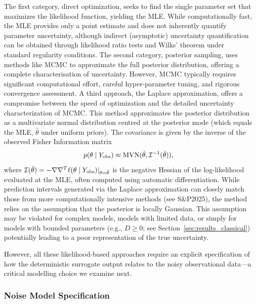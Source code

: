 \documentclass{article}
\newcommand{\SP}{S\&P2025}
\begin{document}
The first category, direct optimization, seeks to find the single parameter set that maximizes the likelihood function, yielding the MLE. While computationally fast, the MLE provides only a point estimate and does not inherently quantify parameter uncertainty, although indirect (asymptotic) uncertainty quantification can be obtained through likelihood ratio tests and Wilks' theorem under standard regularity conditions. The second category, posterior sampling, uses methods like MCMC to approximate the full posterior distribution, offering a complete characterisation of uncertainty. However, MCMC typically requires significant computational effort, careful hyper-parameter tuning, and rigorous convergence assessment. A third approach, the Laplace approximation, offers a compromise between the speed of optimization and the detailed uncertainty characterization of MCMC. This method approximates the posterior distribution as a multivariate normal distribution centred at the posterior mode (which equals the MLE, $\hat{\theta}$ under uniform priors). The covariance is given by the inverse of the observed Fisher Information matrix
\begin{equation}
	p(\theta \mid Y_{\rm obs}) \approx \text{MVN}(\hat{\theta}, \mathcal{I}^{-1}(\hat{\theta})),
\end{equation}
where $\mathcal{I}(\hat{\theta}) = -\nabla\nabla^T \ell(\theta \mid Y_{\rm obs})|_{\theta=\hat{\theta}}$ is the negative Hessian of the log-likelihood evaluated at the MLE, often computed using automatic differentiation. While prediction intervals generated via the Laplace approximation can closely match those from more computationally intensive methods (see \SP), the method relies on the assumption that the posterior is locally Gaussian. This assumption may be violated for complex models, models with limited data, or simply for models with bounded parameters (e.g., $D \ge 0$; see Section~\ref{sec:results_classical}) potentially leading to a poor representation of the true uncertainty.

However, all these likelihood-based approaches require an explicit specification of how the deterministic surrogate output relates to the noisy observational data---a critical modelling choice we examine next.


\subsubsection{Noise Model Specification}\label{sec:noise_model}
\end{document}
